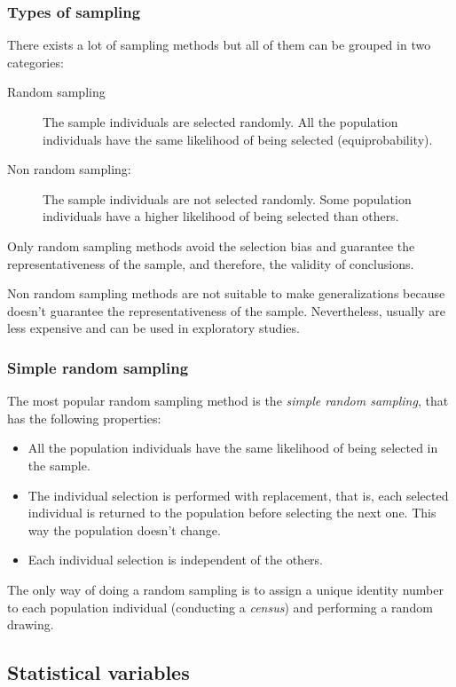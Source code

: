 \begin{frame}
\frametitle{Types of sampling}
There exists a lot of sampling methods but all of them can be grouped in two categories:
\begin{description}
\item[Random sampling] The sample individuals are selected randomly. 
All the population individuals have the same likelihood of being selected (equiprobability).  
\item[Non random sampling:] The sample individuals are not selected randomly. 
Some population individuals have a higher likelihood of being selected than others. 
\end{description}

Only random sampling methods avoid the selection bias and guarantee the representativeness of the sample, and therefore,
the validity of conclusions. 

Non random sampling methods are not suitable to make generalizations because doesn't guarantee the representativeness 
of the sample.
Nevertheless, usually are less expensive and can be used in exploratory studies. 
\end{frame}



\begin{frame}
\frametitle{Simple random sampling}
The most popular random sampling method is the \emph{simple random sampling}, that has the following properties:
\begin{itemize}
\item All the population individuals have the same likelihood of being selected in the sample. 
\item The individual selection is performed with replacement, that is, each selected individual is returned to the
population before selecting the next one. 
This way the population doesn't change. 
\item Each individual selection is independent of the others. 
\end{itemize}

The only way of doing a random sampling is to assign a unique identity number to each population individual
(conducting a \emph{census}) and performing a random drawing.
\end{frame}


\subsection{Statistical variables}

